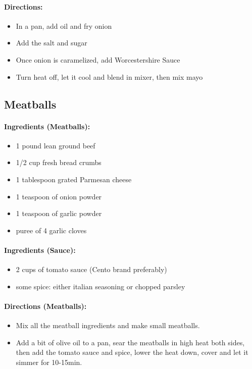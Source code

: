 \documentclass{article}
\begin{document}
\paragraph{Directions:}
\begin{itemize}
    \item In a pan, add oil and fry onion
    \item Add the salt and sugar
    \item Once onion is caramelized, add Worcestershire Sauce
    \item Turn heat off, let it cool and blend in mixer, then mix mayo
\end{itemize}

\subsection{Meatballs} 

\paragraph{Ingredients (Meatballs):}
\begin{itemize}
    \item 1 pound lean ground beef
    \item 1/2 cup fresh bread crumbs
    \item 1 tablespoon grated Parmesan cheese
    \item 1 teaspoon of onion powder
    \item 1 teaspoon of garlic powder
    \item puree of 4 garlic cloves
\end{itemize}  

\paragraph{Ingredients (Sauce):}
\begin{itemize}
    \item 2 cups of tomato sauce (Cento brand preferably)
    \item some spice: either italian seasoning or chopped parsley
\end{itemize}  

\paragraph{Directions (Meatballs):}
\begin{itemize}
    \item Mix all the meatball ingredients and make small meatballs.
    \item Add a bit of olive oil to a pan, sear the meatballs in high heat both sides, then add the tomato sauce and spice, lower the heat down, cover and let it simmer for 10-15min.
\end{itemize}  
\end{document}
